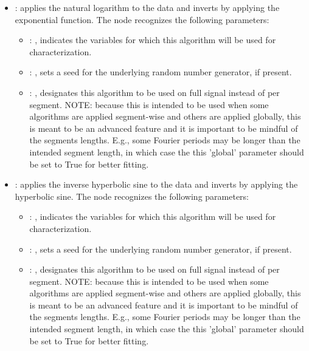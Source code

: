 \begin{itemize}
    \item {}:
      applies the natural logarithm to the data and inverts by applying the
      exponential function.
      The  node recognizes the following parameters:
        \begin{itemize}
          \item {}: ,
            indicates the variables for which this algorithm will be used for characterization.
          \item {}: ,
            sets a seed for the underlying random number generator, if present.
          \item {}: ,
            designates this algorithm to be used on full signal instead of per
            segment. NOTE: because this is intended to be used when some algorithms are
            applied segment-wise and others are applied globally, this is meant to be an
            advanced feature and it is important to be mindful of the segments lengths.
            E.g., some Fourier periods may be longer than the intended segment length, in
            which case the this 'global' parameter should be set to True for better
            fitting. 
      \end{itemize}

    \item {}:
      applies the inverse hyperbolic sine to the data and inverts by applying
      the hyperbolic sine.
      The  node recognizes the following parameters:
        \begin{itemize}
          \item {}: ,
            indicates the variables for which this algorithm will be used for characterization.
          \item {}: ,
            sets a seed for the underlying random number generator, if present.
          \item {}: ,
            designates this algorithm to be used on full signal instead of per
            segment. NOTE: because this is intended to be used when some algorithms are
            applied segment-wise and others are applied globally, this is meant to be an
            advanced feature and it is important to be mindful of the segments lengths.
            E.g., some Fourier periods may be longer than the intended segment length, in
            which case the this 'global' parameter should be set to True for better
            fitting. 
      \end{itemize}


\end{itemize}
